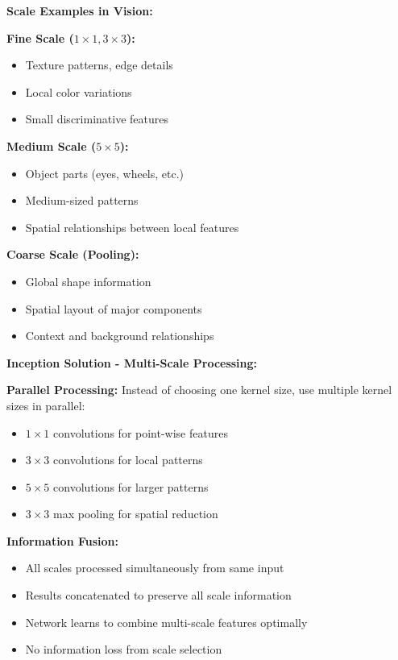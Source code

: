 \documentclass[12pt]{article}
\begin{document}
\begin{enumerate}[(a)]
{    \textbf{Scale Examples in Vision:}
    
    \textbf{Fine Scale ($1 \times 1, 3 \times 3$):}
    \begin{itemize}
        \item Texture patterns, edge details
        \item Local color variations
        \item Small discriminative features
    \end{itemize}
    
    \textbf{Medium Scale ($5 \times 5$):}
    \begin{itemize}
        \item Object parts (eyes, wheels, etc.)
        \item Medium-sized patterns
        \item Spatial relationships between local features
    \end{itemize}
    
    \textbf{Coarse Scale (Pooling):}
    \begin{itemize}
        \item Global shape information
        \item Spatial layout of major components
        \item Context and background relationships
    \end{itemize}
    
    \textbf{Inception Solution - Multi-Scale Processing:}
    
    \textbf{Parallel Processing:}
    Instead of choosing one kernel size, use multiple kernel sizes in parallel:
    \begin{itemize}
        \item $1 \times 1$ convolutions for point-wise features
        \item $3 \times 3$ convolutions for local patterns
        \item $5 \times 5$ convolutions for larger patterns
        \item $3 \times 3$ max pooling for spatial reduction
    \end{itemize}
    
    \textbf{Information Fusion:}
    \begin{itemize}
        \item All scales processed simultaneously from same input
        \item Results concatenated to preserve all scale information
        \item Network learns to combine multi-scale features optimally
        \item No information loss from scale selection
    \end{itemize}
    
}
\end{enumerate}
\end{document}
